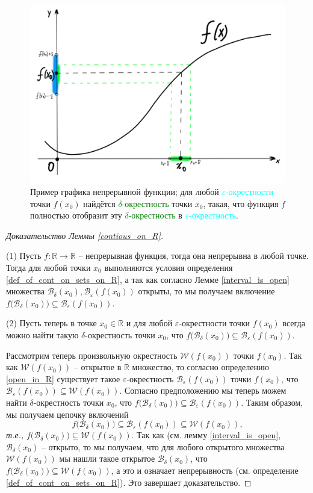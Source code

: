 \begin{figure}[h!]
    \centering
    \includegraphics[width=0.7\linewidth]{images/continous.png}
    \caption{Пример графика непрерывной функции; для любой \textcolor{cyan}{$\varepsilon$-окрестности} точки $f(x_0)$ найдётся \textcolor{green}{$\delta$-окрестность} точки $x_0$, такая, что функция $f$ полностью отобразит эту \textcolor{green}{$\delta$-окрестность} в \textcolor{cyan}{$\varepsilon$-окрестность}.} 
    \label{fig:enter-label}
\end{figure}

\begin{proof}[Доказательство Леммы \ref{contious_on_R}]~

(1) Пусть $f:\mathbb{R} \to \mathbb{R}$ -- непрерывная функция, тогда она непрерывна в любой точке. Тогда для любой точки $x_0$ выполняются условия определения \ref{def_of_cont_on_sets_on_R}, а так как согласно Лемме \ref{interval_is_open} множества $\mathscr{B}_\delta(x_0), \mathscr{B}_\varepsilon(f(x_0))$ открыты, то мы получаем включение $f\bigl(\mathscr{B}_\delta(x_0) \bigr) \subseteq \mathscr{B}_\varepsilon(f(x_0)).$

(2) Пусть теперь в точке $x_0 \in \mathbb{R}$ и для любой $\varepsilon$-окрестности точки $f(x_0)$ всегда можно найти такую $\delta$-окрестность точки $x_0$, что $ f\bigl(\mathscr{B}_{\delta}(x_0) \bigr) \subseteq \mathscr{B}_{\varepsilon}(f(x_0))$. 

Рассмотрим теперь произвольную окрестность $\mathscr{W}(f(x_0))$ точки $f(x_0)$. Так как $\mathscr{W}(f(x_0))$ -- открытое в $\mathbb{R}$ множество, то согласно  определению \ref{open_in_R} существует такое $\varepsilon$-окрестность $\mathscr{B}_\varepsilon(f(x_0))$ точки $f(x_0)$, что $\mathscr{B}_\varepsilon(f(x_0)) \subseteq \mathscr{W}(f(x_0))$. Согласно предположению мы теперь можем найти $\delta$-окрестность точки $x_0$, что $ f\bigl(\mathscr{B}_{\delta}(x_0) \bigr) \subseteq \mathscr{B}_{\varepsilon}(f(x_0))$. Таким образом, мы получаем цепочку включений
\[
 f\bigl(\mathscr{B}_{\delta}(x_0) \bigr) \subseteq \mathscr{B}_{\varepsilon}(f(x_0)) \subseteq \mathscr{W}(f(x_0)),
\]
\textit{т.е.,} $f\bigl(\mathscr{B}_{\delta}(x_0) \bigr) \subseteq \mathscr{W}(f(x_0))$. Так как  (см. лемму \ref{interval_is_open}, $\mathscr{B}_{\delta}(x_0)$ -- открыто, то мы получаем, что для любого открытого множества $\mathscr{W}(f(x_0))$ мы нашли такое открытое $\mathscr{B}_{\delta}(x_0)$, что $f\bigl(\mathscr{B}_{\delta}(x_0) \bigr) \subseteq \mathscr{W}(f(x_0))$, а это и означает непрерывность (см. определение \ref{def_of_cont_on_sets_on_R}). Это завершает доказательство.
\end{proof}

